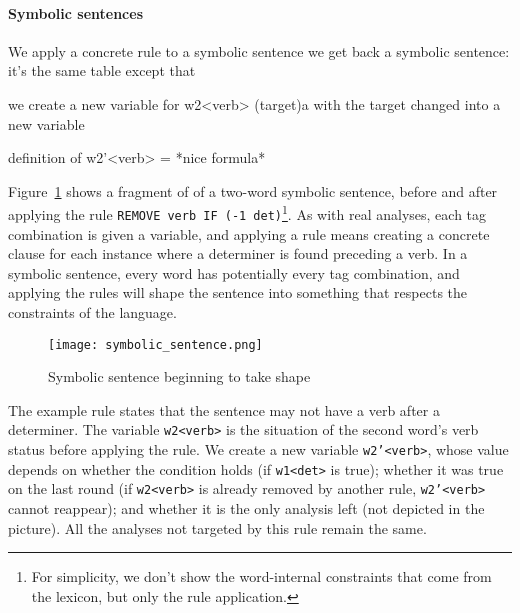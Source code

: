 
\paragraph{Symbolic sentences}

We apply a concrete rule to a symbolic sentence
we get back a symbolic sentence: it's the same table except that 

we create a new variable for w2<verb> (target)a
 with the target changed into a new variable

definition of w2'<verb> = *nice formula*


Figure~\ref{fig:example} shows a fragment of of a two-word symbolic sentence, before and after applying the rule \texttt{REMOVE verb IF (-1 det)}\footnote{For simplicity, we don't show the word-internal constraints that come from the lexicon, but only the rule application.}.
As with real analyses, each tag combination is given a variable, and applying a rule means creating a concrete clause for each instance where a determiner is found preceding a verb.
In a symbolic sentence, every word has potentially every tag combination, and applying the rules will shape the sentence into something that respects the constraints of the language.

\begin{figure}[h]
\texttt{[image: symbolic\_sentence.png]}
\caption{Symbolic sentence beginning to take shape }
\label{fig:example}
\end{figure}


The example rule states that the sentence may not have a verb after a determiner.
The variable \texttt{w2<verb>} is the situation of the second word's verb status before applying the rule. We create a new variable \texttt{w2'<verb>}, whose value depends on whether the condition holds (if \texttt{w1<det>} is true); whether it was true on the last round (if \texttt{w2<verb>} is already removed by another rule, \texttt{w2'<verb>} cannot reappear); and whether it is the only analysis left (not depicted in the picture).
All the analyses not targeted by this rule remain the same.



